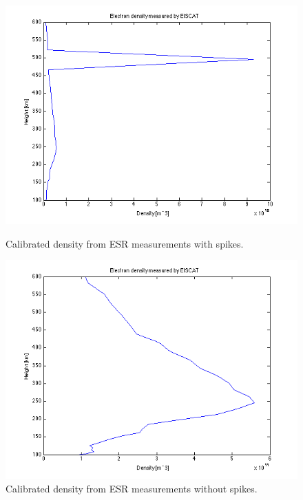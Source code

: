 \documentclass{article}
\begin{document}
\begin{figure}[h!tb]
		\centering
	\begin{minipage}[t]{0.45\linewidth}
		\includegraphics[width=\textwidth]{Figures/density_cal.png}
		\caption{Calibrated density from ESR measurements with spikes.}
		\label{fig:density_cal}
	\end{minipage}
	\begin{minipage}[t]{0.45\linewidth}
		\includegraphics[width=\textwidth]{Figures/density_cal_no_spikes.png}
		\caption{Calibrated density from ESR measurements without spikes.}
		\label{fig:density_cal_no_spikes}
	\end{minipage}
\end{figure}
\end{document}
